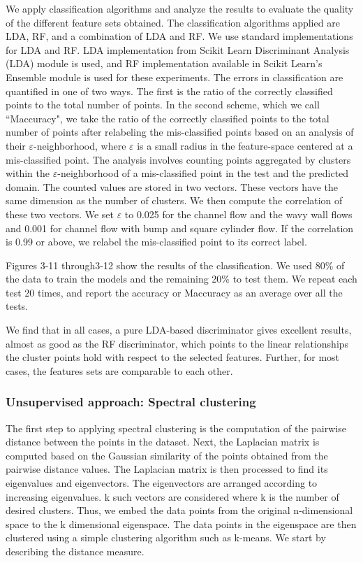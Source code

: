 We apply classiﬁcation algorithms and analyze the results to evaluate the quality of the different feature
sets obtained. The classiﬁcation algorithms applied are LDA, RF, and a combination of LDA and RF. We
use standard implementations for LDA and RF. LDA implementation from Scikit Learn Discriminant
Analysis (LDA) module is used, and RF implementation available in Scikit Learn’s Ensemble module is used for
these experiments. The errors in classiﬁcation are quantiﬁed in one of two ways. The ﬁrst is the ratio of the
correctly classiﬁed points to the total number of points. In the second scheme, which we call “Maccuracy",
we take the ratio of the correctly classiﬁed points to the total number of points after relabeling the
mis-classiﬁed points based on an analysis of their $\varepsilon$-neighborhood, where $\varepsilon$ is a small radius in the feature-space centered at a mis-classiﬁed point. The analysis involves counting points aggregated by clusters within the $\varepsilon$-neighborhood of a mis-classiﬁed point in the test and the predicted domain. The counted values are stored in two vectors. These vectors have the same dimension as the number of clusters. We then compute the correlation of these two vectors. We set $\varepsilon$ to 0.025 for the channel ﬂow and the wavy wall ﬂows and 0.001 for channel ﬂow with bump and square cylinder ﬂow. If the correlation is 0.99 or above, we relabel the mis-classiﬁed point to its correct label.

Figures 3-11 through3-12 show the results of the classiﬁcation. We used 80\% of the data to train the
models and the remaining 20\% to test them. We repeat each test 20 times, and report the accuracy or
Maccuracy as an average over all the tests.

We ﬁnd that in all cases, a pure LDA-based discriminator gives excellent results, almost as good as the RF discriminator, which points to the linear relationships the cluster points hold with respect to the selected features. Further, for most cases, the features sets are comparable to each other.

\subsubsection{Unsupervised approach: Spectral clustering}

The ﬁrst step to applying spectral clustering is the computation of the pairwise distance between the points in the dataset. Next, the Laplacian matrix is computed based on the Gaussian similarity of the points obtained from the pairwise distance values. The Laplacian matrix is then processed to ﬁnd its eigenvalues and eigenvectors. The eigenvectors are arranged according to increasing eigenvalues. k such vectors are considered where k is the number of desired clusters. Thus, we embed the data points from the original n-dimensional space to the k dimensional eigenspace. The data points in the eigenspace are then clustered using a simple clustering algorithm such as k-means. We start by describing the distance measure.

